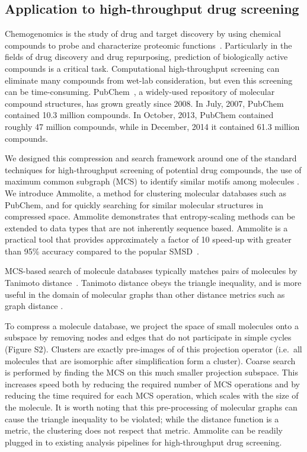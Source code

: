 \documentclass[review,preprint,12pt]{elsarticle}
\renewcommand{\cite}{\citep} %
\theoremstyle{definition}
\theoremstyle{remark}
\numberwithin{equation}{section}
\begin{document}
\subsection{Application to high-throughput drug screening}

Chemogenomics is the study of drug and target discovery by using chemical
compounds to probe and characterize proteomic 
functions~\cite{bredel2004chemogenomics}.
Particularly in the fields of drug discovery and drug repurposing, prediction 
of biologically active compounds is a critical task. 
Computational high-throughput screening can eliminate many compounds from 
wet-lab consideration, but even this screening can be time-consuming.
PubChem~\cite{bolton2008pubchem}, a widely-used repository of molecular compound 
structures, 
has grown greatly since 2008. 
In July, 2007, PubChem contained 10.3 million compounds.
In October, 2013, PubChem contained roughly 47 million compounds, while
in December, 2014 it contained 61.3 million compounds.

We designed this compression and search framework around one of the standard 
techniques for high-throughput screening of potential drug compounds, the use 
of maximum common subgraph (MCS) to identify similar motifs among molecules \cite{cao2008maximum, rahman2009small}.
We introduce Ammolite, a method for clustering molecular databases such as 
PubChem, and for quickly searching for 
similar molecular structures in compressed space.
Ammolite demonstrates that entropy-scaling methods can be extended to data types that are not inherently sequence based.
Ammolite is a practical 
tool that provides approximately a factor of 10 speed-up with greater than 95\% accuracy compared to the popular SMSD~\cite{rahman2009small}.

MCS-based search of molecule databases typically matches pairs of molecules by 
Tanimoto distance~\cite{rahman2009small}. 
Tanimoto distance obeys the triangle inequality, and is more useful in the 
domain of molecular graphs than other
distance metrics such as graph distance \cite{bunke1998graph}.

To compress a molecule database, we project the space of small molecules onto a subspace by removing nodes and edges that do not participate in simple cycles
(Figure S2).
Clusters are exactly pre-images of of this projection operator (i.e.~all molecules that are isomorphic after simplification form a cluster).
Coarse search is performed by finding the MCS on this much smaller projection subspace. This increases speed both by reducing the required number of MCS operations 
and by reducing the time required for each MCS operation, which scales with the size of the molecule.
It is worth noting that this pre-processing of molecular graphs can cause the 
triangle inequality to be violated; while the distance function is a metric, the
clustering does not respect that metric.
Ammolite can be readily plugged in to existing analysis pipelines for 
high-throughput drug screening.
\end{document}
